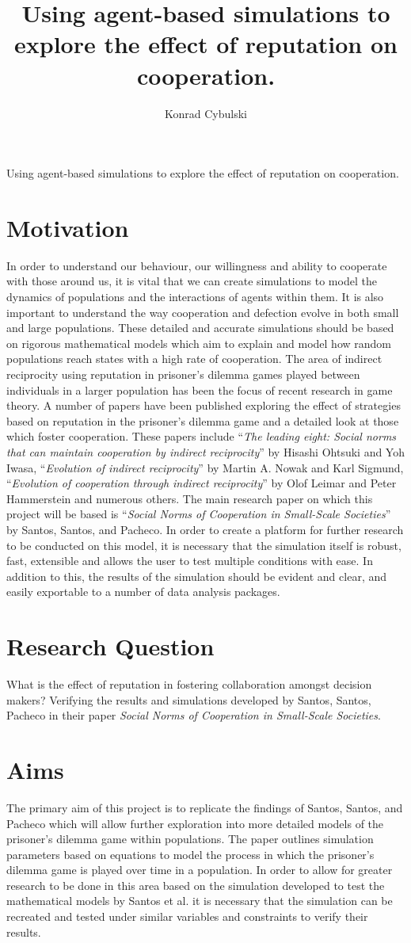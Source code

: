 \documentclass[10pt,a4paper]{article}
\author{Konrad Cybulski}
\title{Using agent-based simulations to explore the effect of reputation on cooperation.}
\begin{document}
\begin{Large}
Using agent-based simulations to explore the effect of reputation on cooperation.
\end{Large}
\section{Motivation}
In order to understand our behaviour, our willingness and ability to cooperate with those around us, it is vital that we can create simulations to model the dynamics of populations and the interactions of agents within them. It is also important to understand the way cooperation and defection evolve in both small and large populations.
These detailed and accurate simulations should be based on rigorous mathematical models which aim to explain and model how random populations reach states with a high rate of cooperation. The area of indirect reciprocity using reputation in prisoner’s dilemma games played between individuals in a larger population has been the focus of recent research in game theory. 
A number of papers have been published exploring the effect of strategies based on reputation in the prisoner’s dilemma game and a detailed look at those which foster cooperation. These papers include “\textit{The leading eight: Social norms that can maintain cooperation by indirect reciprocity}” by Hisashi Ohtsuki and Yoh Iwasa, “\textit{Evolution of indirect reciprocity}” by Martin A. Nowak and Karl Sigmund, “\textit{Evolution of cooperation through indirect reciprocity}” by Olof Leimar and Peter Hammerstein and numerous others. The main research paper on which this project will be based is “\textit{Social Norms of Cooperation in Small-Scale Societies}” by Santos, Santos, and Pacheco. 
In order to create a platform for further research to be conducted on this model, it is necessary that the simulation itself is robust, fast, extensible and allows the user to test multiple conditions with ease. In addition to this, the results of the simulation should be evident and clear, and easily exportable to a number of data analysis packages. 
\section{Research Question}
What is the effect of reputation in fostering collaboration amongst decision makers? Verifying the results and simulations developed by Santos, Santos, Pacheco in their paper \textit{Social Norms of Cooperation in Small-Scale Societies}. 
\section{Aims}
The primary aim of this project is to replicate the findings of Santos, Santos, and Pacheco which will allow further exploration into more detailed models of the prisoner’s dilemma game within populations. The paper outlines simulation parameters based on equations to model the process in which the prisoner’s dilemma game is played over time in a population. In order to allow for greater research to be done in this area based on the simulation developed to test the mathematical models by Santos et al. it is necessary that the simulation can be recreated and tested under similar variables and constraints to verify their results.
\end{document}
